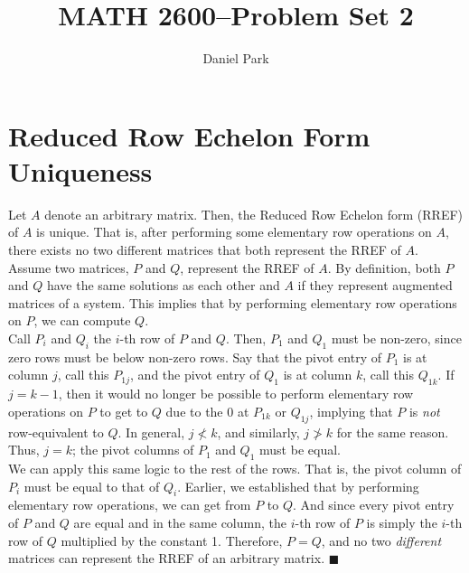 \documentclass[11pt]{article}
\title{MATH 2600--Problem Set 2}
\author{Daniel Park}
\begin{document}
\maketitle

\section{Reduced Row Echelon Form Uniqueness}
Let \(A\) denote an arbitrary matrix. Then, the Reduced Row Echelon form (RREF) of \(A\) is unique. That is, after performing some elementary row operations on \(A\), there exists no two different matrices that both represent the RREF of \(A\).\\[10pt]
Assume two matrices, \(P\) and \(Q\), represent the RREF of \(A\). By definition, both \(P\) and \(Q\) have the same solutions as each other and \(A\) if they represent augmented matrices of a system. This implies that by performing elementary row operations on \(P\), we can compute \(Q\).\\[10pt]
Call \(P_i\) and \(Q_i\) the \(i\)-th row of \(P\) and \(Q\). Then, \(P_1\) and \(Q_1\) must be non-zero, since zero rows must be below non-zero rows. Say that the pivot entry of \(P_1\) is at column \(j\), call this \(P_{1j}\), and the pivot entry of \(Q_1\) is at column \(k\), call this \(Q_{1k}\). If \(j = k - 1\), then it would no longer be possible to perform elementary row operations on \(P\) to get to \(Q\) due to the 0 at \(P_{1k}\) or \(Q_{1j}\), implying that \(P\) is \textit{not} row-equivalent to \(Q\). In general, \(j \nless k\), and similarly, \(j \ngtr k\) for the same reason. Thus, \(j = k\); the pivot columns of \(P_1\) and \(Q_1\) must be equal.\\[10pt]
We can apply this same logic to the rest of the rows. That is, the pivot column of \(P_i\) must be equal to that of \(Q_i\). Earlier, we established that by performing elementary row operations, we can get from \(P\) to \(Q\). And since every pivot entry of \(P\) and \(Q\) are equal and in the same column, the \(i\)-th row of \(P\) is simply the \(i\)-th row of \(Q\) multiplied by the constant 1. Therefore, \(P = Q\), and no two \textit{different} matrices can represent the RREF of an arbitrary matrix. $\blacksquare$\pagebreak
\end{document}
